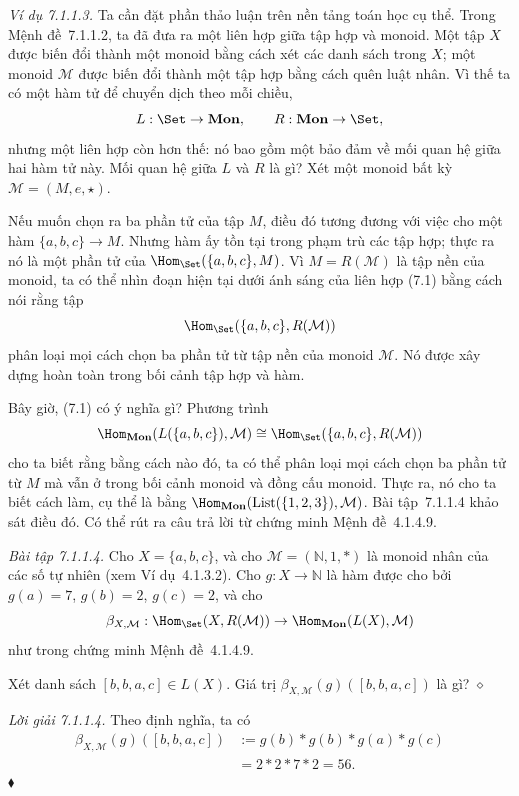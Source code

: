 \noindent\textit{Ví dụ 7.1.1.3.}\keepwithnext
Ta cần đặt phần thảo luận trên nền tảng toán học cụ thể. Trong Mệnh đề~7.1.1.2, ta đã đưa ra một liên hợp giữa tập hợp và monoid. Một tập $X$ được biến đổi thành một monoid bằng cách xét các danh sách trong $X$; một monoid $\mathcal M$ được biến đổi thành một tập hợp bằng cách quên luật nhân. Vì thế ta có một hàm tử để chuyển dịch theo mỗi chiều,
\[
L:\Set\to\mathbf{Mon},\qquad R:\mathbf{Mon}\to\Set,
\]
nhưng một liên hợp còn hơn thế: nó bao gồm một bảo đảm về mối quan hệ giữa hai hàm tử này. Mối quan hệ giữa $L$ và $R$ là gì? Xét một monoid bất kỳ $\mathcal M=(M,e,\star)$.

Nếu muốn chọn ra ba phần tử của tập $M$, điều đó tương đương với việc cho một hàm $\{a,b,c\}\to M$. Nhưng hàm ấy tồn tại trong phạm trù các tập hợp; thực ra nó là một phần tử của $\Hom_{\Set}(\{a,b,c\},M)$. Vì $M=R(\mathcal M)$ là tập nền của monoid, ta có thể nhìn đoạn hiện tại dưới ánh sáng của liên hợp (7.1) bằng cách nói rằng tập
\[
\Hom_{\Set}(\{a,b,c\},R(\mathcal M))
\]
phân loại mọi cách chọn ba phần tử từ tập nền của monoid $\mathcal M$. Nó được xây dựng hoàn toàn trong bối cảnh tập hợp và hàm.

Bây giờ, (7.1) có ý nghĩa gì? Phương trình
\[
\Hom_{\mathbf{Mon}}(L(\{a,b,c\}),\mathcal M)\cong\Hom_{\Set}(\{a,b,c\},R(\mathcal M))
\]
cho ta biết rằng bằng cách nào đó, ta có thể phân loại mọi cách chọn ba phần tử từ $M$ mà vẫn ở trong bối cảnh monoid và đồng cấu monoid. Thực ra, nó cho ta biết cách làm, cụ thể là bằng $\Hom_{\mathbf{Mon}}(\operatorname{List}(\{1,2,3\}),\mathcal M)$. Bài tập~7.1.1.4 khảo sát điều đó. Có thể rút ra câu trả lời từ chứng minh Mệnh đề~4.1.4.9.

\noindent\textit{Bài tập 7.1.1.4.}\keepwithnext
Cho $X=\{a,b,c\}$, và cho $\mathcal M=(\mathbb N,1,\ast)$ là monoid nhân của các số tự nhiên (xem Ví dụ~4.1.3.2). Cho $g:X\to\mathbb N$ là hàm được cho bởi $g(a)=7$, $g(b)=2$, $g(c)=2$, và cho
\[
\beta_{X,\mathcal M}:\Hom_{\Set}(X,R(\mathcal M))\to\Hom_{\mathbf{Mon}}(L(X),\mathcal M)
\]
như trong chứng minh Mệnh đề~4.1.4.9.

Xét danh sách $[b,b,a,c]\in L(X)$. Giá trị $\beta_{X,\mathcal M}(g)([b,b,a,c])$ là gì?
\hfill$\diamond$

\noindent\textit{Lời giải 7.1.1.4.}\keepwithnext
Theo định nghĩa, ta có
\[
\begin{aligned}
\beta_{X,\mathcal M}(g)([b,b,a,c])&:=g(b)\ast g(b)\ast g(a)\ast g(c)\\
&=2\ast2\ast7\ast2=56.
\end{aligned}
\]
\hfill$\blacklozenge$


